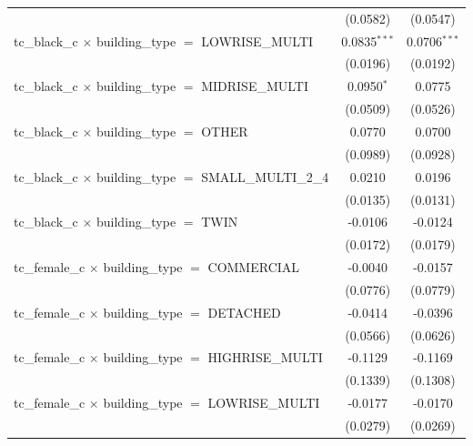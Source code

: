 \begin{tabular}{lcc}
                                                                       & (0.0582)       & (0.0547)\\   
   tc\_black\_c $\times$ building\_type $=$ LOWRISE\_MULTI             & 0.0835$^{***}$ & 0.0706$^{***}$\\   
                                                                       & (0.0196)       & (0.0192)\\   
   tc\_black\_c $\times$ building\_type $=$ MIDRISE\_MULTI             & 0.0950$^{*}$   & 0.0775\\   
                                                                       & (0.0509)       & (0.0526)\\   
   tc\_black\_c $\times$ building\_type $=$ OTHER                      & 0.0770         & 0.0700\\   
                                                                       & (0.0989)       & (0.0928)\\   
   tc\_black\_c $\times$ building\_type $=$ SMALL\_MULTI\_2\_4         & 0.0210         & 0.0196\\   
                                                                       & (0.0135)       & (0.0131)\\   
   tc\_black\_c $\times$ building\_type $=$ TWIN                       & -0.0106        & -0.0124\\   
                                                                       & (0.0172)       & (0.0179)\\   
   tc\_female\_c $\times$ building\_type $=$ COMMERCIAL                & -0.0040        & -0.0157\\   
                                                                       & (0.0776)       & (0.0779)\\   
   tc\_female\_c $\times$ building\_type $=$ DETACHED                  & -0.0414        & -0.0396\\   
                                                                       & (0.0566)       & (0.0626)\\   
   tc\_female\_c $\times$ building\_type $=$ HIGHRISE\_MULTI           & -0.1129        & -0.1169\\   
                                                                       & (0.1339)       & (0.1308)\\   
   tc\_female\_c $\times$ building\_type $=$ LOWRISE\_MULTI            & -0.0177        & -0.0170\\   
                                                                       & (0.0279)       & (0.0269)\\   

\end{tabular}
